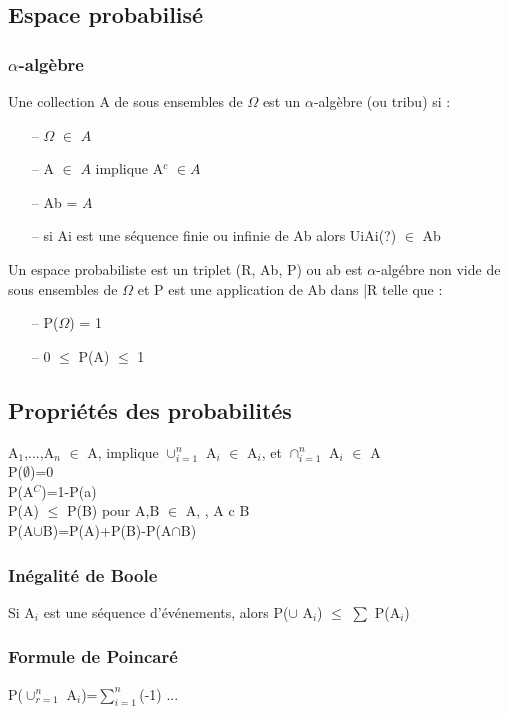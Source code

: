 \documentclass{article}
\begin{document}
        \subsection{Espace probabilisé}
            \subsubsection{$\alpha$-algèbre}
                Une collection A de sous ensembles de $\Omega$ est un $\alpha$-algèbre
                (ou tribu) si :
                \begin{itemize}
                    \item[--] $\Omega$ $\in$ $A$
                    \item[--] A $\in$ $A$ implique A$^c$ $\in A$ 
                    \item[--] Ab = $A$
                    \item[--] si {Ai} est une séquence finie ou infinie de Ab alors UiAi(?) $\in$ Ab
                \end{itemize}
                Un espace probabiliste est un triplet (R, Ab, P) ou ab est $\alpha$-algébre non vide 
                de sous ensembles de $\Omega$ et P est une application de Ab dans |R telle que :
                \begin{itemize}
                    \item[--] P($\Omega$) = 1
                    \item[--] 0 $\le$ P(A) $\le$ 1 
                \end{itemize}
        \subsection{Propriétés des probabilités}
            A$_1$,...,A$_n$ $\in$ A, implique $\cup^{n}_{i=1}$ A$_i$ $\in$ A$_i$, et $\cap^{n}_{i=1}$ A$_i$ $\in$ A\\
            P($\emptyset$)=0\\
            P(A$^C$)=1-P(a)\\
            P(A) $\le$ P(B) pour A,B $\in$ A, , A c B\\
            P(A$\cup$B)=P(A)+P(B)-P(A$\cap$B)
            \subsubsection{Inégalité de Boole}
                Si {A$_i$} est une séquence d'événements, alors P($\cup$ A$_i$) $\le$ $\sum$ P(A$_i$)
            \subsubsection{Formule de Poincaré}
                P($\cup_{r=1}^{n}$ A$_i$)=$\sum_{i=1}^{n}$(-1) ... 
\end{document}
